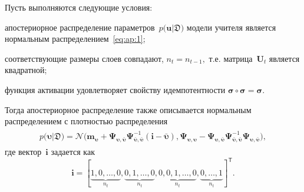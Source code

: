 \documentclass[12pt]{a&t}
\begin{document}
\begin{theorem}
\label{theorem:ap:layer}
Пусть выполняются следующие условия:
\begin{enumlist}
\item апостериорное распределение параметров~$p\bigr(\mathbf{u}|\mathfrak{D}\bigr)$ модели учителя является нормальным распределением~\eqref{eq:ap:1};
\item соответствующие размеры слоев совпадают, $n_t=n_{t-1},$ т.е. матрица~$\mathbf{U}_t$ является квадратной;
\item функция активации удовлетворяет свойству идемпотентности $\bm{\sigma} \circ \bm{\sigma} = \bm{\sigma}$.
\end{enumlist}

Тогда апостериорное распределение также описывается нормальным распределением с плотностью распределения
\begin{gather}
\label{eq:ap:5}
\begin{aligned}
p\bigr(\bm{\upsilon}|\mathfrak{D}\bigr) = \mathcal{N}\bigr(\mathbf{m}_{\bm{\upsilon}}+\bm{\Psi}_{\bm{\upsilon},\bar{\bm{\upsilon}}} \bm{\Psi}_{\bar{\bm{\upsilon}},\bar{\bm{\upsilon}}}^{-1} \left(\mathbf{i} - \bar{\bm{\upsilon}}\right), \bm{\Psi}_{\bm{\upsilon},\bm{\upsilon}} - \bm{\Psi}_{\bm{\upsilon},\bar{\bm{\upsilon}}}\bm{\Psi}_{\bar{\bm{\upsilon}},\bar{\bm{\upsilon}}}^{-1}\bm{\Psi}_{\bm{\upsilon},\bar{\bm{\upsilon}}}\bigr),
\end{aligned}
\end{gather}
где вектор~$\mathbf{i}$ задается как
\[
\mathbf{i}=[\underbrace{1, 0, \ldots, 0}_{n_t}, \underbrace{0, 1, \ldots, 0}_{n_t}, \underbrace{0, 0, 1, \ldots, 0}_{n_t}, \underbrace{0, \ldots, 1}_{n_t}]^{\mathsf{T}}.
\]
\end{theorem}
\end{document}
